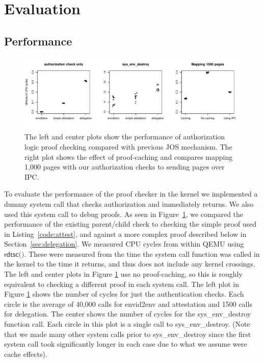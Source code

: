 \documentclass[10pt]{article}
\begin{document}
\section{Evaluation}\label{sec:eval}
\subsection{Performance}
\begin{figure}
\includegraphics[width=\textwidth]{plots.pdf}
\caption{The left and center plots show the performance of authorization logic proof checking compared with previous JOS mechanism.  The right plot shows the effect of proof-caching and compares mapping 1,000 pages with our authorization checks to sending pages over IPC.}
\label{fig:perf}
\end{figure}
To evaluate the performance of the proof checker in the kernel we implemented a dummy system call that checks authorization and immediately returns. We also used this system call to debug proofs.  As seen in Figure~\ref{fig:perf}, we compared the performance of the existing parent/child check to checking the simple proof used in Listing~\ref{code:attest}, and against a more complex proof described below in Section~\ref{sec:delegation}.  We measured CPU cycles from within QEMU using $\textsf{rdtsc()}$. These were measured from the time the system call function was called in the kernel to the time it returns, and thus does not include any kernel crossings.  The left and center plots in Figure \ref{fig:perf} use no proof-caching, so this is roughly equivalent to checking a different proof in each system call.  The left plot in Figure \ref{fig:perf} shows the number of cycles for just the authentication checks.  Each circle is the average of 40,000 calls for \textsf{envid2env} and attestation and 1500 calls for delegation.  The center shows the number of cycles for the \textsf{sys\_env\_destroy} function call.  Each circle in this plot is a single call to \textsf{sys\_env\_destroy}. (Note that we made many other system calls prior to \textsf{sys\_env\_destroy} since the first system call took significantly longer in each case due to what we assume were cache effects).
\end{document}
